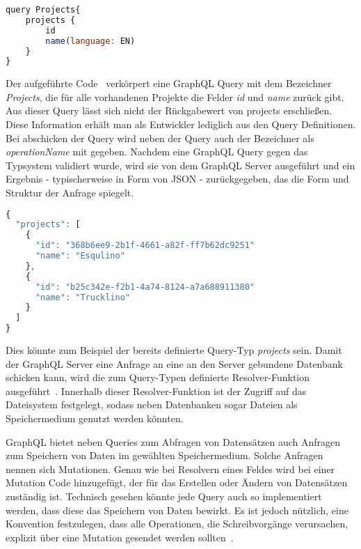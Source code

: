 \begin{lstlisting}[language=Javascript,float=h!,caption={GraphQL Query mit dem Bezeichner Projects}, label={fig:basics:graphql:5}]
query Projects{
    projects {
        id
        name(language: EN)
    }
}
\end{lstlisting}

Der aufgeführte Code~ verkörpert eine GraphQL Query mit dem Bezeichner \emph{Projects},
die für alle vorhandenen Projekte die Felder \emph{id} und \emph{name} zurück gibt. 
Aus dieser Query lässt sich nicht der Rückgabewert von projects erschließen.
Diese Information erhält man als Entwickler lediglich aus den Query Definitionen.
Bei abschicken der Query wird neben der Query auch der 
Bezeichner als \emph{operationName} mit gegeben.
Nachdem eine GraphQL Query gegen das Typsystem validiert wurde, wird sie von dem GraphQL Server ausgeführt und
ein Ergebnis - typischerweise in Form von JSON - zurückgegeben, das die Form und Struktur der Anfrage spiegelt.

\begin{lstlisting}[language=Javascript,float=h!,caption={JSON Antwort auf die Projects Query}, label={fig:basics:graphql:6}]
{
  "projects": [
    {
      "id": "368b6ee9-2b1f-4661-a82f-ff7b62dc9251"
      "name": "Esqulino"
    },
    {
      "id": "b25c342e-f2b1-4a74-8124-a7a688911380"
      "name": "Trucklino"
    }
  ]
}
\end{lstlisting}




Dies könnte zum Beispiel der bereits definierte Query-Typ \emph{projects} sein.
Damit der GraphQL Server eine Anfrage an eine an den Server gebundene Datenbank schicken kann, wird die zum Query-Typen definierte
Resolver-Funktion ausgeführt~\cite{graphql-execution}. Innerhalb dieser Resolver-Funktion ist der Zugriff auf das Dateisystem festgelegt, sodass
neben Datenbanken sogar Dateien als Speichermedium genutzt werden könnten.

GraphQL bietet neben Queries zum Abfragen von Datensätzen auch Anfragen zum Speichern von Daten im gewählten Speichermedium. Solche Anfragen nennen sich Mutationen. Genau wie bei Resolvern eines Feldes wird bei einer Mutation Code hinzugefügt, der  für das Erstellen oder Ändern von Datensätzen zuständig ist. Technisch gesehen könnte jede Query auch so implementiert werden, dass diese das Speichern von Daten bewirkt. Es ist jedoch nützlich, eine Konvention festzulegen, dass alle Operationen, die Schreibvorgänge verursachen, explizit über eine Mutation gesendet werden sollten~\cite{graphql-mutations}.

